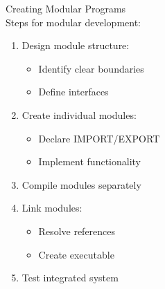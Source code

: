 \begin{KR}{Creating Modular Programs}\\
Steps for modular development:
\begin{enumerate}
  \item Design module structure:
    \begin{itemize}
      \item Identify clear boundaries
      \item Define interfaces
    \end{itemize}
  \item Create individual modules:
    \begin{itemize}
      \item Declare IMPORT/EXPORT
      \item Implement functionality
    \end{itemize}
  \item Compile modules separately
  \item Link modules:
    \begin{itemize}
      \item Resolve references
      \item Create executable
    \end{itemize}
  \item Test integrated system
\end{enumerate}
\end{KR}